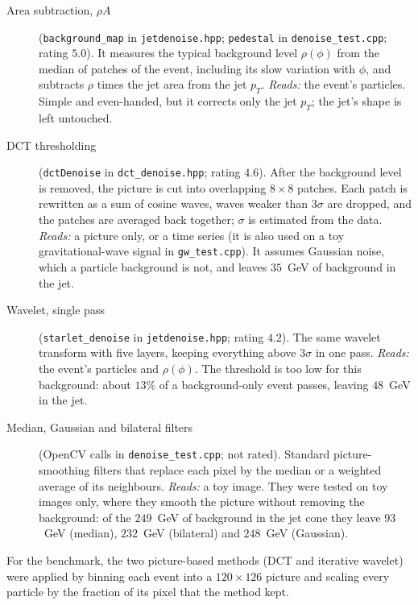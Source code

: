 \begin{description}
  \item[Area subtraction, $\rho A$] (\texttt{background\_map} in
    \texttt{jetdenoise.hpp}; \texttt{pedestal} in \texttt{denoise\_test.cpp};
    rating $5.0$).
    It measures the typical background level $\rho(\phi)$ from the median of
    patches of the event, including its slow variation with $\phi$, and
    subtracts $\rho$ times the jet area from the jet $p_T$. \emph{Reads:} the
    event's particles. Simple and even-handed, but it corrects only the jet
    $p_T$; the jet's shape is left untouched.

  \item[DCT thresholding] (\texttt{dctDenoise} in \texttt{dct\_denoise.hpp};
    rating $4.6$).
    After the background level is removed, the picture is cut into overlapping
    $8\times8$ patches. Each patch is rewritten as a sum of cosine waves, waves
    weaker than $3\sigma$ are dropped, and the patches are averaged back
    together; $\sigma$ is estimated from the data. \emph{Reads:} a picture
    only, or a time series (it is also used on a toy gravitational-wave signal
    in \texttt{gw\_test.cpp}). It assumes Gaussian noise, which a particle
    background is not, and leaves $35$~GeV of background in the jet.

  \item[Wavelet, single pass] (\texttt{starlet\_denoise} in
    \texttt{jetdenoise.hpp}; rating $4.2$).
    The same wavelet transform with five layers, keeping everything above
    $3\sigma$ in one pass. \emph{Reads:} the event's particles and
    $\rho(\phi)$. The threshold is too low for this background: about $13\%$ of
    a background-only event passes, leaving $48$~GeV in the jet.

  \item[Median, Gaussian and bilateral filters] (OpenCV calls in
    \texttt{denoise\_test.cpp}; not rated).
    Standard picture-smoothing filters that replace each pixel by the median or
    a weighted average of its neighbours. \emph{Reads:} a toy image. They were
    tested on toy images only, where they smooth the picture without removing
    the background: of the $249$~GeV of background in the jet cone they leave
    $93$~GeV (median), $232$~GeV (bilateral) and $248$~GeV (Gaussian).
\end{description}

For the benchmark, the two picture-based methods (DCT and iterative wavelet)
were applied by binning each event into a $120\times126$ picture and scaling
every particle by the fraction of its pixel that the method kept.
